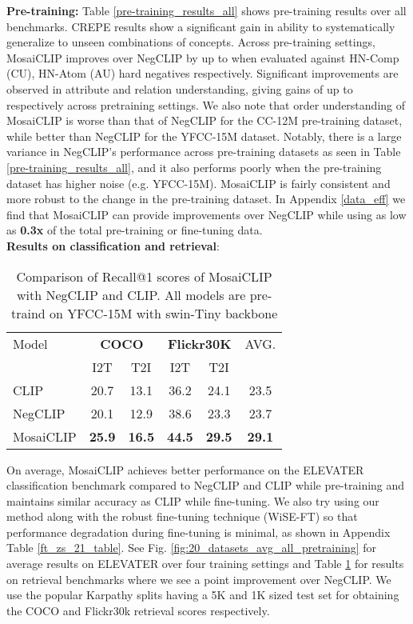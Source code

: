 \documentclass[11pt]{article}
\newcommand{\methodcomp}{MosaiCLIP}
\newcommand{\clip}{CLIP}
\newcommand{\negclip}{NegCLIP}
\begin{document}
\noindent \textbf{Pre-training:} Table \ref{pre-training_results_all} shows pre-training results over all benchmarks. CREPE results show a significant gain in ability to systematically generalize to unseen combinations of concepts. Across pre-training settings, \methodcomp{} improves over \negclip{} by up to {} when evaluated against HN-Comp (CU), HN-Atom (AU) hard negatives respectively. Significant improvements are observed in attribute and relation understanding, giving gains of up to {} respectively across pretraining settings. We also note that order understanding of \methodcomp{} is worse than that of \negclip{} for the CC-12M pre-training dataset, while better than \negclip{} for the YFCC-15M dataset. Notably, there is a large variance in \negclip{}'s performance across pre-training datasets as seen in Table \ref{pre-training_results_all}, and it also performs poorly when the pre-training dataset has higher noise (e.g. YFCC-15M). \methodcomp{} is fairly consistent and more robust to the change in the pre-training dataset. In Appendix \ref{data_eff} we find that \methodcomp{} can provide improvements over \negclip{} while using as low as \textbf{0.3x} of the total pre-training or fine-tuning data.\\
\newline
\noindent \textbf{Results on classification and retrieval}:
\begin{table}[h]
\fontsize{10.5}{13pt}\selectfont
    \centering
    \begin{tabular}{lcccc|c}
    \toprule
    {Model} & \multicolumn{2}{c}{\textbf{COCO}} &  \multicolumn{2}{c}{\textbf{Flickr30K}} & {AVG.}\\
    \cmidrule(lr){2-3} \cmidrule(lr){4-5}
    & {I2T} & {T2I} & {I2T} & {T2I} & \\
    \midrule
    CLIP & 20.7 & 13.1 & 36.2 & 24.1 & 23.5 \\
    NegCLIP & 20.1 & 12.9 & 38.6 & 23.3 & 23.7 \\
    \rowcolor{cyan!12}
    MosaiCLIP & \textbf{25.9} & \textbf{16.5} & \textbf{44.5} & \textbf{29.5} & \textbf{29.1} \\
    \bottomrule
    \end{tabular}
    \caption{Comparison of Recall@1 scores of \methodcomp{} with \negclip{} and \clip{}. All models are pre-traind on YFCC-15M with swin-Tiny backbone}
    \label{classification-results}
    \vspace{-1.5em}
\end{table}
On average, \methodcomp{} achieves  better performance on the ELEVATER classification benchmark compared to \negclip{} and \clip{} while pre-training and maintains similar accuracy as \clip{} while fine-tuning. We also try using our method along with the robust fine-tuning technique (WiSE-FT) so that performance degradation during fine-tuning is minimal, as shown in Appendix Table \ref{ft_zs_21_table}. See Fig. \ref{fig:20_datasets_avg_all_pretraining} for average results on ELEVATER over four training settings and Table \ref{classification-results} for results on retrieval benchmarks where we see a  point improvement over \negclip{}. We use the popular Karpathy splits having a 5K and 1K sized test set for obtaining the COCO and Flickr30k retrieval scores respectively.
\end{document}
